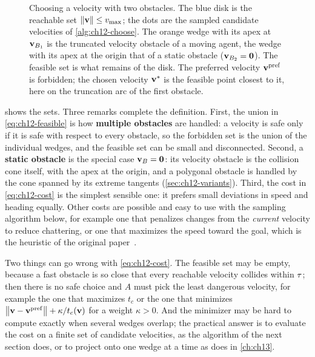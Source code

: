 \begin{figure}[tb]
  \centering
  \caption{Choosing a velocity with two obstacles. The blue disk is the
  reachable set $\left\lVert \mathbf{v} \right\rVert\le v_{\max}$; the dots are the sampled candidate
  velocities of \cref{alg:ch12-choose}. The orange wedge with its apex at
  $\mathbf{v}_{B_1}$ is the truncated velocity obstacle of a moving agent, the wedge
  with its apex at the origin that of a static obstacle ($\mathbf{v}_{B_2}=\mathbf{0}$).
  The feasible set is what remains of the disk. The preferred velocity
  $\mathbf{v}^{\mathrm{pref}}$ is forbidden; the chosen velocity $\mathbf{v}^*$ is the
  feasible point closest to it, here on the truncation arc of the first
  obstacle.}
  \label{fig:ch12-feasible}
\end{figure}

 shows the sets. Three remarks complete the
definition. First, the union in \cref{eq:ch12-feasible} is how
\textbf{multiple obstacles} are handled: a
velocity is safe only if it is safe with respect to every obstacle, so the
forbidden set is the union of the individual wedges, and the feasible set can
be small and disconnected. Second, a \textbf{static
obstacle} is the special case
$\mathbf{v}_B = \mathbf{0}$: its velocity obstacle is the collision cone itself, with
the apex at the origin, and a polygonal obstacle is handled by the cone
spanned by its extreme tangents (\cref{sec:ch12-variants}). Third, the cost in
\cref{eq:ch12-cost} is the simplest sensible one: it prefers small deviations
in speed and heading equally. Other costs are possible and easy to use with the
sampling algorithm below, for example one that penalizes changes from the
\emph{current} velocity to reduce chattering, or one that maximizes the speed
toward the goal, which is the heuristic of the original
paper~\cite{fiorini1998motion}.

Two things can go wrong with \cref{eq:ch12-cost}. The feasible set may be
empty, because a fast obstacle is so close that every reachable velocity
collides within $\tau$; then there is no safe choice and $A$ must pick the
least dangerous velocity, for example the one that maximizes $t_c$ or the one
that minimizes $\left\lVert \mathbf{v} - \mathbf{v}^{\mathrm{pref}} \right\rVert + \kappa/t_c(\mathbf{v})$ for a
weight $\kappa > 0$. And the minimizer may be hard to compute exactly when
several wedges overlap; the practical answer is to evaluate the cost on a
finite set of candidate velocities, as the algorithm of the next section does,
or to project onto one wedge at a time as \orca does in \cref{ch:ch13}.

